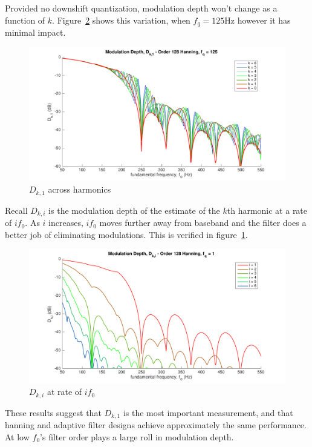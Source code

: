 \documentclass [11pt, proquest,oneside] {ganter_thesis}[2015/03/03]
\begin{document}
Provided no downshift quantization, modulation depth won't change as a function of $k$.  Figure~\ref{fig:d_ki_4} shows this variation, when $f_q = 125$Hz however it has minimal impact.

\begin{figure}[!ht]
  \centering
    \includegraphics[width=1\textwidth]{d_ki_3}
    \caption{$D_{k,1}$ across harmonics}\label{fig:d_ki_3}
\end{figure}

Recall $D_{k,i}$ is the modulation depth of the estimate of the $k$th harmonic at a rate of $if_0$.  As $i$ increases, $if_0$ moves further away from baseband and the filter does a better job of eliminating modulations.  This is verified in figure~\ref{fig:d_ki_3}.

\begin{figure}[!ht]
  \centering
    \includegraphics[width=1\textwidth]{d_ki_4}
    \caption{$D_{k,i}$ at rate of $if_0$}\label{fig:d_ki_4}
\end{figure}

These results suggest that $D_{k,1}$ is the most important measurement, and that hanning and adaptive filter designs achieve approximately the same performance.  At low $f_0$'s filter order plays a large roll in modulation depth.
\end{document}
